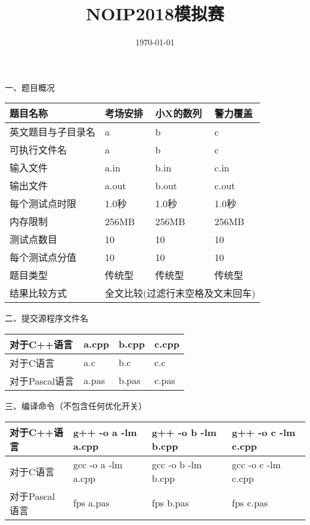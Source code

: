 \documentclass{article}
\title{NOIP2018模拟赛}
\date{\today}
\begin{document}
	\maketitle

	一、题目概况
	\begin{table}[htbp]
	\centering
	\begin{tabular}{|p{100pt}<{\centering}|p{118pt}<{\centering}|p{118pt}<{\centering}|p{118pt}<{\centering}|}
		\hline
		题目名称 & 考场安排 & 小X的数列 & 警力覆盖 \\
		\hline
		英文题目与子目录名 & a & b & c \\
		\hline
		可执行文件名 & a & b & c \\
		\hline
		输入文件 & a.in & b.in & c.in \\
		\hline
		输出文件 & a.out & b.out & c.out \\
		\hline
		每个测试点时限 & 1.0秒 & 1.0秒 & 1.0秒 \\
		\hline
		内存限制 & 256MB & 256MB & 256MB \\
		\hline
		测试点数目 & 10 & 10 & 10 \\
		\hline
		每个测试点分值 & 10 & 10 & 10 \\
		\hline
		题目类型 & 传统型 & 传统型 & 传统型 \\
		\hline
		结果比较方式 & \multicolumn{3}{|c|}{全文比较(过滤行末空格及文末回车)} \\
		\hline
	\end{tabular}
	\end{table}
		
	二、提交源程序文件名
	\begin{table}[htbp]
	\centering
	\begin{tabular}{|p{100pt}<{\centering}|p{118pt}<{\centering}|p{118pt}<{\centering}|p{118pt}<{\centering}|}
		\hline
		对于C++语言 & a.cpp & b.cpp & c.cpp \\
		\hline
		对于C语言 & a.c & b.c & c.c \\
		\hline
		对于Pascal语言 & a.pas & b.pas & c.pas \\
		\hline
	\end{tabular}
	\end{table}

	三、编译命令（不包含任何优化开关）
	\begin{table}[htbp]
	\centering
	\begin{tabular}{|p{100pt}<{\centering}|p{118pt}<{\centering}|p{118pt}<{\centering}|p{118pt}<{\centering}|}
		\hline
		对于C++语言 & g++ -o a -lm a.cpp & g++ -o b -lm b.cpp & g++ -o c -lm c.cpp \\
		\hline
		对于C语言 & gcc -o a -lm a.cpp & gcc -o b -lm b.cpp & gcc -o c -lm c.cpp \\
		\hline
		对于Pascal语言 & fps a.pas & fps b.pas & fps c.pas \\
		\hline
	\end{tabular}
	\end{table}
\end{document}
